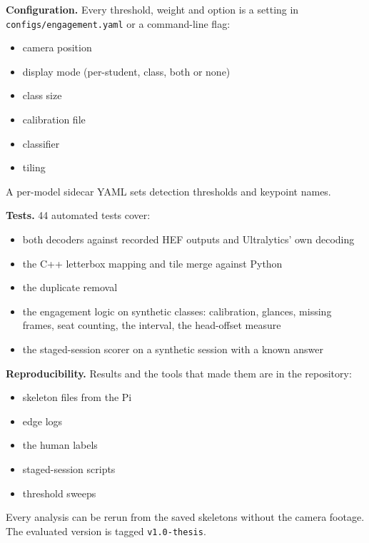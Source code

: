 \textbf{Configuration.} Every threshold, weight and option is a setting in \texttt{configs/engagement.yaml} or a command-line flag:

\begin{itemize}
\tightlist
\item
  camera position
\item
  display mode (per-student, class, both or none)
\item
  class size
\item
  calibration file
\item
  classifier
\item
  tiling
\end{itemize}

A per-model sidecar YAML sets detection thresholds and keypoint names.

\textbf{Tests.} 44 automated tests cover:

\begin{itemize}
\tightlist
\item
  both decoders against recorded HEF outputs and Ultralytics' own decoding
\item
  the C++ letterbox mapping and tile merge against Python
\item
  the duplicate removal
\item
  the engagement logic on synthetic classes: calibration, glances, missing frames, seat counting, the interval, the head-offset measure
\item
  the staged-session scorer on a synthetic session with a known answer
\end{itemize}

\textbf{Reproducibility.} Results and the tools that made them are in the repository:

\begin{itemize}
\tightlist
\item
  skeleton files from the Pi
\item
  edge logs
\item
  the human labels
\item
  staged-session scripts
\item
  threshold sweeps
\end{itemize}

Every analysis can be rerun from the saved skeletons without the camera footage. The evaluated version is tagged \texttt{v1.0-thesis}.
